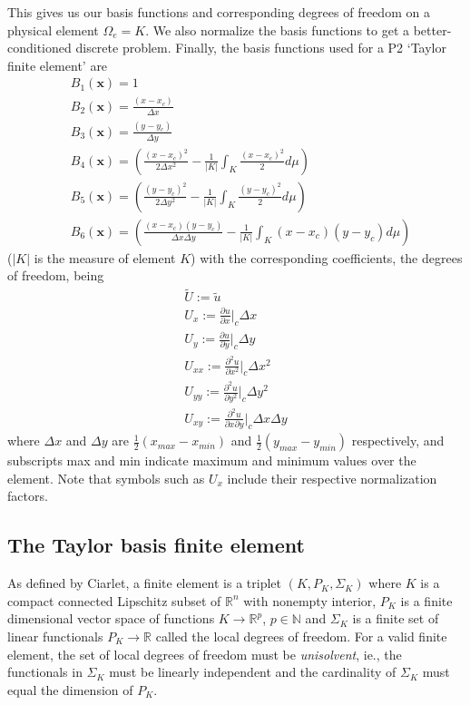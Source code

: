 \documentclass[11pt]{article}
\let\bld\boldsymbol
\begin{document}
This gives us our basis functions and corresponding degrees of freedom on a physical element $\Omega_e = K$. We also normalize the basis functions to get a better-conditioned discrete problem. Finally, the basis functions used for a P2 `Taylor finite element' are
\begin{align}
&B_1(\bld{x}) = 1 
\label{eq:taylorbasis0} \\
&B_2(\bld{x}) = \frac{(x-x_c)}{\Delta x} \\
&B_3(\bld{x}) = \frac{(y-y_c)}{\Delta y} \\
&B_4(\bld{x}) = \left( \frac{(x-x_c)^2}{2\Delta x^2} - \frac{1}{|K|}\int_{K} \frac{(x-x_c)^2}{2}d\mu \right) \\
&B_5(\bld{x}) = \left( \frac{(y-y_c)^2}{2\Delta y^2} -\frac{1}{|K|}\int_{K} \frac{(y-y_c)^2}{2}d\mu \right) \\
&B_6(\bld{x}) = \left( \frac{(x-x_c)(y-y_c)}{\Delta x\Delta y} - \frac{1}{|K|}\int_{K} (x-x_c)(y-y_c)d\mu \right)
\label{eq:taylorbasis}
\end{align}
($|K|$ is the measure of element $K$) with the corresponding coefficients, the degrees of freedom, being
\begin{align}
\tilde{U} := \tilde{u} \\
U_x := \frac{\partial u}{\partial x}\Big|_c \Delta x \\
U_y := \frac{\partial u}{\partial y}\Big|_c \Delta y \\
U_{xx} := \frac{\partial^2 u}{\partial x^2}\Big|_c \Delta x^2 \\
U_{yy} := \frac{\partial^2 u}{\partial y^2}\Big|_c \Delta y^2 \\
U_{xy} := \frac{\partial^2 u}{\partial x\partial y}\Big|_c \Delta x\Delta y
\label{eq:taylordofs}
\end{align}
where $\Delta x$ and $\Delta y$ are $\frac12 (x_{max}-x_{min})$ and $\frac12 (y_{max}-y_{min})$ respectively, and subscripts max and min indicate maximum and minimum values over the element. Note that symbols such as $U_x$ include their respective normalization factors.

\subsection{The Taylor basis finite element}
As defined by Ciarlet, a finite element is a triplet $(K, P_K, \Sigma_K)$ where $K$ is a compact connected Lipschitz subset of $\mathbb{R}^n$ with nonempty interior, $P_K$ is a finite dimensional vector space of functions $K \rightarrow \mathbb{R}^p$, $p \in \mathbb{N}$ and $\Sigma_K$ is a finite set of linear functionals $P_K \rightarrow \mathbb{R}$ called the local degrees of freedom. For a valid finite element, the set of local degrees of freedom must be \emph{unisolvent}, ie., the functionals in $\Sigma_K$ must be linearly independent and the cardinality of $\Sigma_K$ must equal the dimension of $P_K$.
\end{document}
